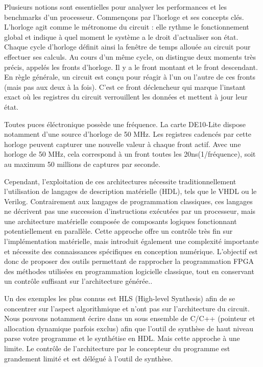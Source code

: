 \documentclass{article}
\begin{document}
Plusieurs notions sont essentielles pour analyser les performances et les benchmarks d'un processeur. Commençons par l'horloge et ses concepts clés.
L'horloge agit comme le métronome du circuit : elle rythme le fonctionnement global et indique à quel moment le système a le droit d'actualiser son état. 
Chaque cycle d'horloge définit ainsi la fenêtre de temps allouée au circuit pour effectuer ses calculs.
Au cours d'un même cycle, on distingue deux moments très précis, appelés les fronts d'horloge. Il y a le front montant et le front descendant.
En règle générale, un circuit est conçu pour réagir à l'un ou l'autre de ces fronts (mais pas aux deux à la fois). 
C'est ce front déclencheur qui marque l'instant exact où les registres du circuit verrouillent les données et mettent à jour leur état.

Toutes puces éléctronique possède une fréquence. La carte DE10-Lite dispose notamment d'une source d'horloge de 50 MHz. 
Les registres cadencés par cette horloge peuvent capturer une nouvelle valeur à chaque front actif. 
Avec une horloge de 50 MHz, cela correspond à un front toutes les 20ns(1/fréquence), soit au maximum 50 millions de captures par seconde.

Cependant, l'exploitation de ces architectures nécessite traditionnellement l'utilisation de langages de description matérielle (HDL), tels que le VHDL ou le Verilog. 
Contrairement aux langages de programmation classiques, ces langages ne décrivent pas une succession d'instructions exécutées par un processeur, 
mais une architecture matérielle composée de composants logiques fonctionnant potentiellement en parallèle. 
Cette approche offre un contrôle très fin sur l'implémentation matérielle, mais introduit également une complexité importante et 
nécessite des connaissances spécifiques en conception numérique. 
L'objectif est donc de proposer des outils permettant de rapprocher la programmation FPGA des méthodes utilisées en programmation logicielle classique, 
tout en conservant un contrôle suffisant sur l'architecture générée.. 

Un des exemples les plus connus est HLS (High-level Synthesis)\cite{these_hls} afin de se concentrer sur l'aspect algorithmique et n'ont pas sur l'architecture du circuit. 
Nous pouvons notamment écrire dans un sous ensemble de C/C++ (pointeur et allocation dynamique parfois exclus) afin que l'outil de synthèse de haut niveau 
parse votre programme et le synthétise en HDL. 
Mais cette approche à une limite. Le contrôle de l'architecture par le concepteur du programme est grandement limité et est délégué à l'outil de synthèse.
\end{document}
